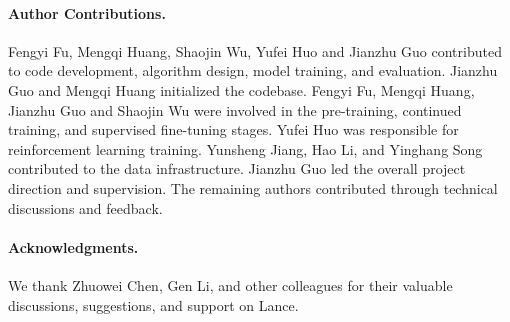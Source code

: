 \documentclass{llmxive}
\providecommand{\thefootnote}{\fnsymbol{footnote}}
\providecommand{\beginappendix}{\appendix{\titlefont\sffamily \seedblue{Appendix}\par}}
\begin{document}
\paragraph{Author Contributions.}
Fengyi Fu, Mengqi Huang, Shaojin Wu, Yufei Huo and Jianzhu Guo contributed to code development, algorithm design, model training, and evaluation.
Jianzhu Guo and Mengqi Huang initialized the codebase.
Fengyi Fu, Mengqi Huang, Jianzhu Guo and Shaojin Wu were involved in the pre-training, continued training, and supervised fine-tuning stages.
Yufei Huo was responsible for reinforcement learning training.
Yunsheng Jiang, Hao Li, and Yinghang Song contributed to the data infrastructure.
Jianzhu Guo led the overall project direction and supervision.
The remaining authors contributed through technical discussions and feedback.

\paragraph{Acknowledgments.}
We thank Zhuowei Chen, Gen Li, and other colleagues for their valuable discussions, suggestions, and support on Lance.








% 
\end{document}
